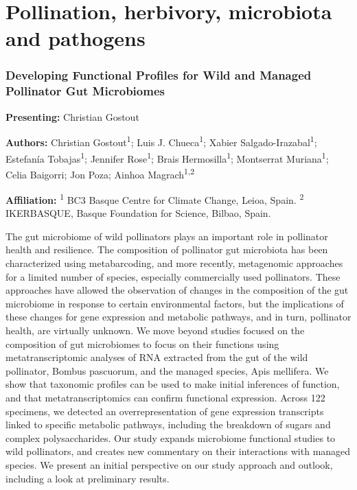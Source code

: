\documentclass[
  letterpaper,
  DIV=11,
  numbers=noendperiod]{scrartcl}
\begin{document}
\section{Pollination, herbivory, microbiota and
pathogens}\label{pollination-herbivory-microbiota-and-pathogens}

\subsubsection{Developing Functional Profiles for Wild and Managed
Pollinator Gut
Microbiomes}\label{developing-functional-profiles-for-wild-and-managed-pollinator-gut-microbiomes}

\textbf{Presenting:} Christian Gostout

\textbf{Authors:} Christian Gostout\textsuperscript{1}; Luis J.
Chueca\textsuperscript{1}; Xabier Salgado-Irazabal\textsuperscript{1};
Estefanía Tobajas\textsuperscript{1}; Jennifer Rose\textsuperscript{1};
Brais Hermosilla\textsuperscript{1}; Montserrat
Muriana\textsuperscript{1}; Celia Baigorri; Jon Poza; Ainhoa
Magrach\textsuperscript{1,2}

\textbf{Affiliation:} \textsuperscript{1} BC3 Basque Centre for Climate
Change, Leioa, Spain. \textsuperscript{2} IKERBASQUE, Basque Foundation
for Science, Bilbao, Spain.

The gut microbiome of wild pollinators plays an important role in
pollinator health and resilience. The composition of pollinator gut
microbiota has been characterized using metabarcoding, and more
recently, metagenomic approaches for a limited number of species,
especially commercially used pollinators. These approaches have allowed
the observation of changes in the composition of the gut microbiome in
response to certain environmental factors, but the implications of these
changes for gene expression and metabolic pathways, and in turn,
pollinator health, are virtually unknown. We move beyond studies focused
on the composition of gut microbiomes to focus on their functions using
metatranscriptomic analyses of RNA extracted from the gut of the wild
pollinator, Bombus pascuorum, and the managed species, Apis mellifera.
We show that taxonomic profiles can be used to make initial inferences
of function, and that metatranscriptomics can confirm functional
expression. Across 122 specimens, we detected an overrepresentation of
gene expression transcripts linked to specific metabolic pathways,
including the breakdown of sugars and complex polysaccharides. Our study
expands microbiome functional studies to wild pollinators, and creates
new commentary on their interactions with managed species. We present an
initial perspective on our study approach and outlook, including a look
at preliminary results.
\end{document}
